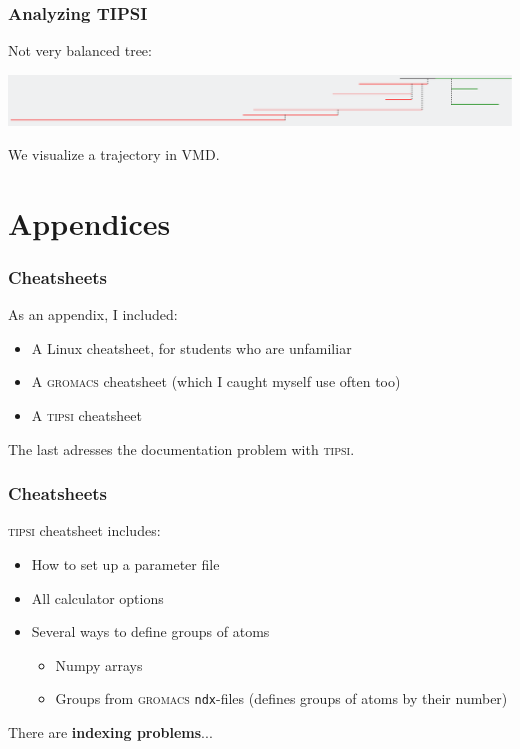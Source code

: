\documentclass[hyperref={pdfpagelabels=false}]{beamer}
\begin{document}
\begin{frame}
\frametitle{Analyzing \textsc{TIPSI}} 
Not very balanced tree:
\begin{center}
\includegraphics[scale=0.2]{images/tree_dnabr.png}
\end{center}
We visualize a trajectory in VMD.
\end{frame}

\section{Appendices}
\setcounter{subsection}{1}

\begin{frame}
\frametitle{Cheatsheets}
As an appendix, I included:
\begin{itemize}
\item A Linux cheatsheet, for students who are unfamiliar
\item A \textsc{gromacs} cheatsheet (which I caught myself use often too)
\item A \textsc{tipsi} cheatsheet
\end{itemize}
The last adresses the documentation problem with \textsc{tipsi}.
\end{frame}

\begin{frame}
\frametitle{Cheatsheets}
\textsc{tipsi} cheatsheet includes:
\begin{itemize}
\item How to set up a parameter file
\item All calculator options
\item Several ways to define groups of atoms
\begin{itemize}
\item Numpy arrays
\item Groups from \textsc{gromacs} \texttt{ndx}-files (defines groups of atoms by their number)
\end{itemize}
\end{itemize}
There are \textbf{indexing problems}...
\end{frame}
\end{document}
